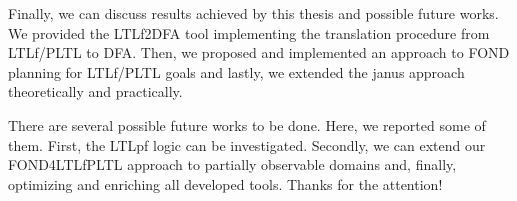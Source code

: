 \documentclass[]{article}
\begin{document}
\bigskip
Finally, we can discuss results achieved by this thesis and possible future works. We provided the LTLf2DFA tool implementing the translation procedure from LTLf/PLTL to DFA. Then, we proposed and implemented an approach to FOND planning for LTLf/PLTL goals and lastly, we extended the janus approach theoretically and practically.

There are several possible future works to be done. Here, we reported some of them. First, the LTLpf logic can be investigated. Secondly, we can extend our FOND4LTLfPLTL approach to partially observable domains and, finally, optimizing and enriching all developed tools. Thanks for the attention!
\end{document}
